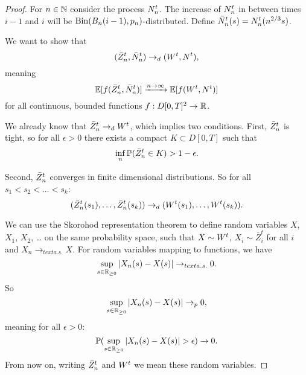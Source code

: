 \begin{proof}

For $n \in \mathbb{N}$ consider the process $N_n^t$.
The increase of $N_n^t$ in between times $i-1$ and $i$ will be $\operatorname*{Bin}(B_n(i-1),p_n)$-distributed.
Define $\bar{N}_n^t(s) = N_n^t(n^{2 / 3}s)$.

We want to show that
\begin{equation}
(\bar{Z}^t_n, \bar{N}_n^t) \rightarrow_d (W^t, N^t),
\end{equation}
meaning 
\begin{equation}
\mathbb{E}[f(\bar{Z}^t_n, \bar{N}_n^t)] \xrightarrow{n \rightarrow \infty} \mathbb{E}[f(W^t, N^t)]
\end{equation}
for all continuous, bounded functions $f:D[0,T]^2\rightarrow\mathbb{R}$.

We already know that $\bar{Z}^t_n \rightarrow_d W^t$, which implies two conditions.
First, $\bar{Z}^t_n$ is tight, 
so for all $\epsilon>0$ there exists a compact $K \subset D[0,T]$ such that
\begin{equation}
\inf_n \mathbb{P} ( \bar{Z}^t_n \in K) > 1 - \epsilon.
\end{equation}

Second, $\bar{Z}^t_n$ converges in finite dimensional distributions.
So for all $s_1 < s_2 < \dots < s_k$:
\begin{equation}
(\bar{Z}^t_n(s_1), \dots, \bar{Z}^t_n(s_k)) \rightarrow_d (W^t(s_1), \dots, W^t(s_k)).
\end{equation}

We can use the Skorohod representation theorem to define random variables $X$, $X_1$, $X_2$, \dots
on the same probability space, such that $X \sim W^t$, $X_i \sim \bar{Z}^t_i$ for all $i$
and $X_n \rightarrow_{text{a.s.}} X$.
For random variables mapping to functions, we have
\begin{equation}
\sup_{s \in \mathbb{R}_{\geq 0}} |X_n(s) - X(s)| \rightarrow_{text{a.s.}} 0.
\end{equation}
So
\begin{equation} 
\sup_{s \in \mathbb{R}_{\geq 0}} |X_n(s) - X(s)| \rightarrow_p 0,
\end{equation}
meaning for all $\epsilon > 0$:
\begin{equation}
\mathbb{P}( \sup_{s \in \mathbb{R}_{\geq 0}} |X_n(s) - X(s)| > \epsilon ) \rightarrow 0.
\end{equation}
From now on, writing $\bar{Z}^t_n$ and $W^t$ we mean these random variables.






\end{proof}


